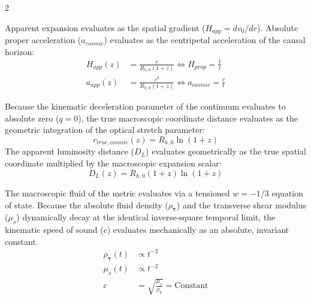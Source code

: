 \documentclass[11pt, a4paper]{article}
\newcounter{cheatnum}
\begin{document}
\begin{multicols}{2}
\begin{tcolorbox}[cheatbox, title={\refstepcounter{cheatnum}\label{box:kinematic_gradients}\thecheatnum. Kinematic Gradients \scriptsize\hfill\hyperref[sec:deriv_kinematic_gradients]{[Proof $\downarrow$]}}]
Apparent expansion evaluates as the spatial gradient ($H_{app} = dv_0/dr$). Absolute proper acceleration ($a_{cosmic}$) evaluates as the centripetal acceleration of the causal horizon:
\begin{align}
    H_{app}(z) &= \frac{c}{R_{h,0}(1+z)} \iff H_{prop} = \frac{1}{t} \label{eq:happ} \\
    a_{app}(z) &= \frac{c^2}{R_{h,0}(1+z)} \iff a_{cosmic} = \frac{c}{t} \label{eq:aapp}
\end{align}
\end{tcolorbox}

\begin{tcolorbox}[cheatbox, title={\refstepcounter{cheatnum}\label{box:optical_dilatation}\thecheatnum. Optical Dilatation \scriptsize\hfill\hyperref[sec:deriv_optical_dilatation]{[Proof $\downarrow$]}}]
Because the kinematic deceleration parameter of the continuum evaluates to absolute zero ($q=0$), the true macroscopic coordinate distance evaluates as the geometric integration of the optical stretch parameter:
\begin{equation}\label{eq:r_cosmic}
    r_{true, cosmic}(z) = R_{h,0} \ln(1+z)
\end{equation}
The apparent luminosity distance ($D_L$) evaluates geometrically as the true spatial coordinate multiplied by the macroscopic expansion scalar:
\begin{equation}\label{eq:dl}
    D_L(z) = R_{h,0} (1+z) \ln(1+z)
\end{equation}
\end{tcolorbox}

\begin{tcolorbox}[cheatbox, title={\refstepcounter{cheatnum}\label{box:acoustic_invariance}\thecheatnum. Cosmic Expansion \& Acoustic Invariance \scriptsize\hfill\hyperref[sec:deriv_acoustic_invariance]{[Proof $\downarrow$]}}]
The macroscopic fluid of the metric evaluates via a tensioned $w = -1/3$ equation of state. Because the absolute fluid density ($\rho_{\boldsymbol{\tau}}$) and the transverse shear modulus ($\mu_s$) dynamically decay at the identical inverse-square temporal limit, the kinematic speed of sound ($c$) evaluates mechanically as an absolute, invariant constant.
\begin{align}
    \rho_{\boldsymbol{\tau}}(t) &\propto t^{-2} \label{eq:density_decay} \\
    \mu_s(t) &\propto t^{-2} \label{eq:stiffness_decay} \\
    c &= \sqrt{\frac{\mu_s}{\rho_{\boldsymbol{\tau}}}} = \text{Constant}  \label{eq:c_invariant}
\end{align}
\end{tcolorbox}


\end{multicols}
\end{document}

